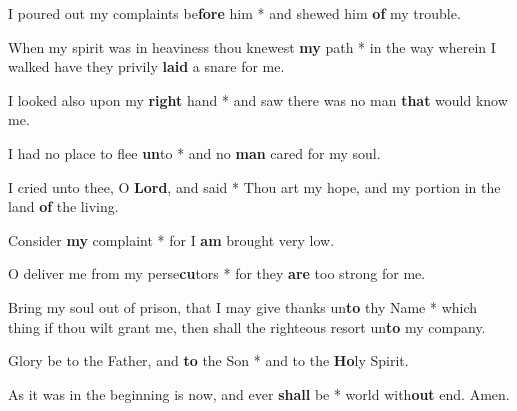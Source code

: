 \begin{multicols}{2}
	I poured out my complaints be\textbf{fore} him * and shewed him \textbf{of} my trouble.
	
	When my spirit was in heaviness thou knewest \textbf{my} path * in the way wherein I walked have they privily \textbf{laid} a snare for me.
	
	I looked also upon my \textbf{right} hand * and saw there was no man \textbf{that} would know me.
	
	I had no place to flee \textbf{un}to * and no \textbf{man} cared for my soul.
	
	I cried unto thee, O \textbf{Lord}, and said * Thou art my hope, and my portion in the land \textbf{of} the living.
	
	Consider \textbf{my} complaint * for I \textbf{am} brought very low.
	
	O deliver me from my perse\textbf{cu}tors * for they \textbf{are} too strong for me.
	
	Bring my soul out of prison, that I may give thanks un\textbf{to} thy Name * which thing if thou wilt grant me, then shall the righteous resort un\textbf{to} my company.
	
	Glory be to the Father, and \textbf{to} the Son * and to the \textbf{Ho}ly Spirit.
	
	As it was in the beginning is now, and ever \textbf{shall} be * world with\textbf{out} end. Amen.
\end{multicols}